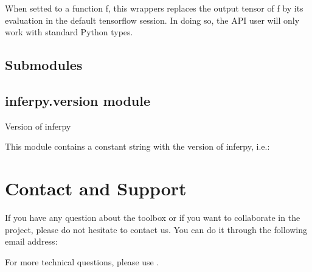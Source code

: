 \documentclass[letterpaper,10pt,english]{sphinxmanual}
\begin{document}

\begin{fulllineitems}
\label{\detokenize{modules/inferpy.util:inferpy.util.wrappers.tf_run_wrapper}}
When setted to a function f, this wrappers replaces the output tensor of f by its evaluation
in the default tensorflow session. In doing so, the API user will only work with standard Python
types.

\end{fulllineitems}



\section{Submodules}
\label{\detokenize{modules/inferpy:submodules}}

\section{inferpy.version module}
\label{\detokenize{modules/inferpy:module-inferpy.version}}\label{\detokenize{modules/inferpy:inferpy-version-module}}
Version of inferpy

This module contains a constant string with the version of inferpy, i.e.:

\begin{sphinxVerbatim}[commandchars=\\\{\}]
   
\end{sphinxVerbatim}


\chapter{Contact and Support}
\label{\detokenize{notes/contact:contact-and-support}}\label{\detokenize{notes/contact::doc}}
If you have any question about the toolbox or if you want to collaborate in the project, please do not hesitate to
contact us. You can do it through the following email address: 

For more technical questions, please use .
\end{document}
